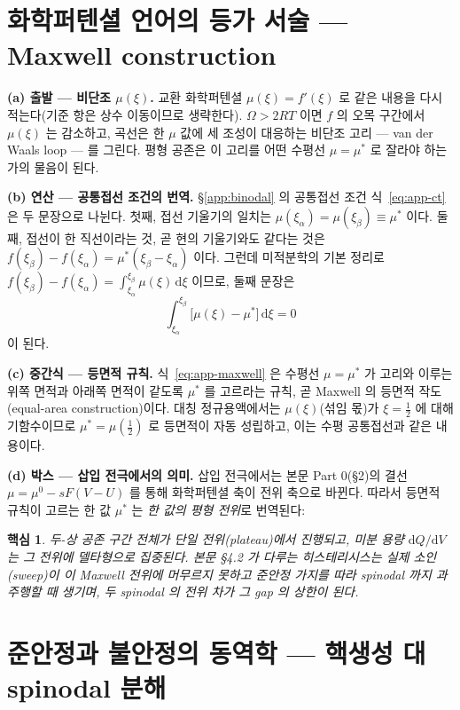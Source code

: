 \documentclass[11pt,a4paper]{article}
\newtheorem*{keybox}{핵심}
\newcommand{\dd}{\mathrm{d}}
\begin{document}
\section{화학퍼텐셜 언어의 등가 서술 --- Maxwell construction}\label{app:maxwell}

\textbf{(a) 출발 --- 비단조 $\mu(\xi)$.} 교환 화학퍼텐셜 $\mu(\xi)=f'(\xi)$ 로 같은 내용을 다시
적는다(기준 항은 상수 이동이므로 생략한다). $\Omega>2RT$ 이면 $f$ 의 오목 구간에서 $\mu(\xi)$ 는
감소하고, 곡선은 한 $\mu$ 값에 세 조성이 대응하는 비단조 고리 --- van der Waals loop --- 를 그린다.
평형 공존은 이 고리를 어떤 수평선 $\mu=\mu^\ast$ 로 잘라야 하는가의 물음이 된다.

\textbf{(b) 연산 --- 공통접선 조건의 번역.} \S\ref{app:binodal} 의 공통접선 조건
식~\eqref{eq:app-ct} 은 두 문장으로 나뉜다. 첫째, 접선 기울기의 일치는
$\mu(\xi_\alpha)=\mu(\xi_\beta)\equiv\mu^\ast$ 이다. 둘째, 접선이 한 직선이라는 것, 곧 현의 기울기와도
같다는 것은 $f(\xi_\beta)-f(\xi_\alpha)=\mu^\ast(\xi_\beta-\xi_\alpha)$ 이다. 그런데 미적분학의 기본
정리로 $f(\xi_\beta)-f(\xi_\alpha)=\int_{\xi_\alpha}^{\xi_\beta}\mu(\xi)\,\dd\xi$ 이므로, 둘째 문장은
\begin{equation}
\int_{\xi_\alpha}^{\xi_\beta}\bigl[\mu(\xi)-\mu^\ast\bigr]\,\dd\xi=0
\label{eq:app-maxwell}
\end{equation}
이 된다.

\textbf{(c) 중간식 --- 등면적 규칙.} 식~\eqref{eq:app-maxwell} 은 수평선 $\mu=\mu^\ast$ 가 고리와
이루는 위쪽 면적과 아래쪽 면적이 같도록 $\mu^\ast$ 를 고르라는 규칙, 곧 Maxwell 의 등면적
작도(equal-area construction)이다. 대칭 정규용액에서는 $\mu(\xi)$(섞임 몫)가 $\xi=\tfrac12$ 에 대해
기함수이므로 $\mu^\ast=\mu(\tfrac12)$ 로 등면적이 자동 성립하고, 이는 수평 공통접선과 같은 내용이다.

\textbf{(d) 박스 --- 삽입 전극에서의 의미.} 삽입 전극에서는 본문 Part 0(\S2)의 결선
$\mu=\mu^0-sF(V-U)$ 를 통해 화학퍼텐셜 축이 전위 축으로 바뀐다. 따라서 등면적 규칙이 고르는 한 값
$\mu^\ast$ 는 \emph{한 값의 평형 전위}로 번역된다:
\begin{keybox}
두-상 공존 구간 전체가 단일 전위(plateau)에서 진행되고, 미분 용량 $\dd Q/\dd V$ 는 그 전위에
델타형으로 집중된다. 본문 \S4.2 가 다루는 히스테리시스는 실제 소인(sweep)이 이 Maxwell 전위에
머무르지 못하고 준안정 가지를 따라 spinodal 까지 과주행할 때 생기며, 두 spinodal 의 전위 차가 그
gap 의 상한이 된다.
\end{keybox}

\section{준안정과 불안정의 동역학 --- 핵생성 대 spinodal 분해}\label{app:kinetics}
\end{document}
